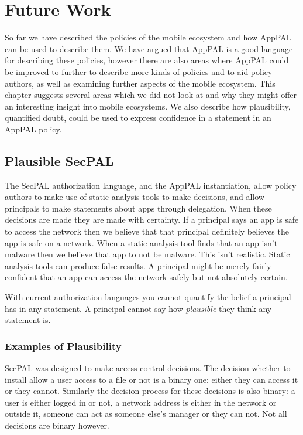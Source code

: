 \documentclass[thesis.tex]{subfiles}
\begin{document}
\chapter{Future Work}
\label{chap:future-work}

So far we have described the policies of the mobile ecosystem and how AppPAL can
be used to describe them. We have argued that AppPAL is a good language for
describing these policies, however there are also areas where AppPAL could be
improved to further to describe more kinds of policies and to aid policy
authors, as well as examining further aspects of the mobile ecosystem. This chapter
suggests several areas which we did not look at and why they might offer an
interesting insight into mobile ecosystems. We also describe how plausibility,
quantified doubt, could be used to express confidence in a statement in an
AppPAL policy.


\section{Plausible SecPAL}

The SecPAL authorization language, and the AppPAL instantiation, allow
policy authors to make use of static analysis tools to make decisions,
and allow principals to make statements about apps through delegation.
When these decisions are made they are made with certainty.  If a
principal says an app is safe to access the network then we believe
that that principal definitely believes the app is safe on a network.
When a static analysis tool finds that an app isn't malware then we
believe that app to not be malware.  This isn't realistic.  Static
analysis tools can produce false results.  A principal might be merely
fairly confident that an app can access the network safely but not absolutely
certain.

With current authorization languages you cannot quantify the belief a principal
has in any statement. A principal cannot say how \emph{plausible} they think any
statement is.

\subsection{Examples of Plausibility}

SecPAL was designed to make access control decisions. The decision whether to
install allow a user access to a file or not is a binary one: either they can
access it or they cannot. Similarly the decision process for these decisions is
also binary: a user is either logged in or not, a network address is either in
the network or outside it, someone can act as someone else's manager or they can
not. Not all decisions are binary however.
\end{document}
